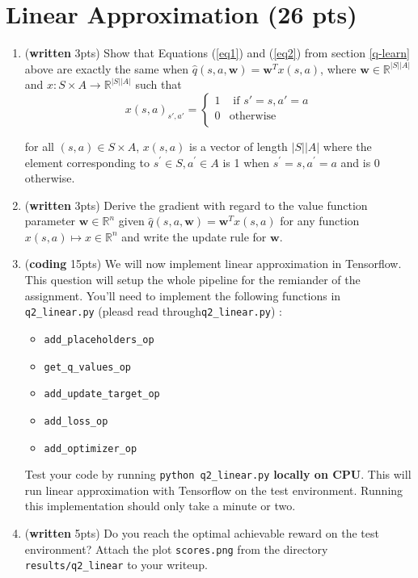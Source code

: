\documentclass{article}
\begin{document}
\section{Linear Approximation (26 pts)}
\begin{enumerate}
\item (\textbf{written} 3pts) Show that Equations (\ref{eq1}) and (\ref{eq2}) from section \ref{q-learn} above are exactly the same when $\hat{q}(s,a, \textbf{w}) = \textbf{w}^Tx(s,a)$, where $\textbf{w} \in \mathbb{R}^{\vert S\vert \vert A\vert }$ and $x: S \times A \rightarrow \mathbb{R}^{\vert S\vert \vert A\vert }$ such that
\[
    x(s,a)_{s',a'}=\left\{
                \begin{array}{ll}
                  1 & \text{ if } s'=s, a'=a\\
                  0 & \text{otherwise}\\
                \end{array}
              \right.
  \]


 for all $(s, a) \in S \times A$, $x(s,a)$ is a vector of length $|S||A|$ where the element corresponding to $s^\prime \in S, a^\prime \in A$ is 1 when $s^\prime = s, a^\prime = a$ and is 0 otherwise.

 \item (\textbf{written} 3pts) Derive the gradient with regard to the value function parameter $\textbf{w} \in \mathbb{R}^n$ given $\hat{q}(s,a, \textbf{w}) = \textbf{w}^Tx(s,a)$ for any function $ x (s, a) \mapsto x \in \mathbb{R}^n $ and write the update rule for $ \textbf{w} $.
 
 \item (\textbf{coding} 15pts) We will now implement linear approximation in Tensorflow. This question will setup the whole pipeline for the remiander of the assignment. You'll need to implement the following functions in \texttt{q2\_linear.py} (pleasd read through\texttt{q2\_linear.py}) :
\begin{itemize}
	\item \texttt{add\_placeholders\_op}
	\item \texttt{get\_q\_values\_op}
	\item \texttt{add\_update\_target\_op}
	\item \texttt{add\_loss\_op}
	\item \texttt{add\_optimizer\_op}
\end{itemize}
Test your code by running \texttt{python q2\_linear.py} \textbf{locally on CPU}.  This will run linear approximation with Tensorflow on the test environment.  Running this implementation should only take a minute or two.
 
 \item (\textbf{written} 5pts) Do you reach the optimal achievable reward on the test environment? Attach the plot \texttt{scores.png} from the directory \texttt{results/q2\_linear} to your writeup.
\end{enumerate}
\end{document}
